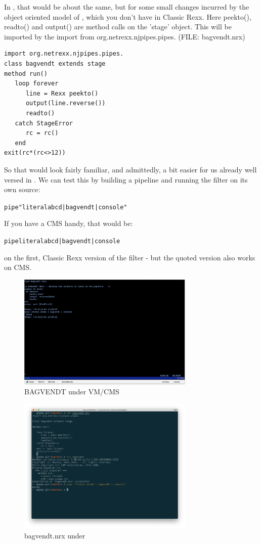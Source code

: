 In \nr{}, that would be about the same, but for some small changes
incurred by the object oriented model of \nr{}, which you don't have in Classic Rexx. Here peekto(), readto() and
output() are method calls on the ’stage’ object. This will be imported
by the import from org.netrexx.njpipes.pipes. (FILE: bagvendt.nrx)
\begin{lstlisting}
import org.netrexx.njpipes.pipes.
class bagvendt extends stage
method run()
   loop forever
      line = Rexx peekto()
      output(line.reverse())
      readto()
   catch StageError
      rc = rc()
   end
exit(rc*(rc<>12))
\end{lstlisting}
So that would look fairly familiar, and admittedly, a bit easier for us already well versed in \nr{}.
We can test this by building a pipeline and running the filter on its
own source:
\begin{alltt}
pipe "literal abcd | bagvendt | console"
 \end{alltt}
If you have a CMS handy, that would be:
\begin{alltt}
pipe literal abcd | bagvendt | console
 \end{alltt}
on the first, Classic Rexx version of the filter - but the quoted
version also works on CMS.
\begin{figure}[h]
  \includegraphics[width=0.75\textwidth]{images/vmbagvendt.png}
  \caption{BAGVENDT under VM/CMS}
  \label{fig:vmbagvendt}
\end{figure}\begin{figure}[h]
  \includegraphics[width=0.75\textwidth]{images/nrbagvendt.png}
  \caption{bagvendt.nrx under \nr{}}
  \label{fig:nrbagvendt}
\end{figure}

